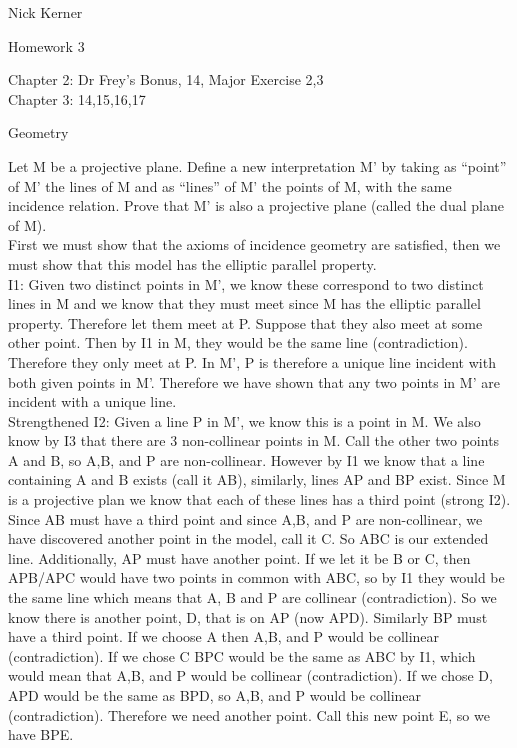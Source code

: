 \documentclass[12pt,letterpaper]{article}
\newcommand{\pro}[1]{\noindent {\bf #1}}
\begin{document}
\begin{flushright}
Nick Kerner

Homework 3

Chapter 2: Dr Frey's Bonus, 14, Major Exercise 2,3\\
Chapter 3: 14,15,16,17
\end{flushright}
\begin{center}
\large{Geometry}\\
\end{center}


\pro{Dr Frey's Bonus but required fun question}

Let M be a projective plane.  Define a new interpretation M' by taking as ``point'' of M' the lines of M and as ``lines'' of M' the points of M, with the same incidence relation.  Prove that M' is also a projective plane (called the dual plane of M).\\

First we must show that the axioms of incidence geometry are satisfied, then we must show that this model has the elliptic parallel property.  \\

I1: Given two distinct points in M', we know these correspond to two distinct lines in M and we know that they must meet since M has the elliptic parallel property.  Therefore let them meet at P. Suppose that they also meet at some other point.  Then by I1 in M, they would be the same line (contradiction).  Therefore they only meet at P.  In M', P is therefore a unique line incident with both given points in M'.  Therefore we have shown that any two points in M' are incident with a unique line.\\

Strengthened I2: Given a line P in M', we know this is a point in M.  We also know by I3 that there are 3 non-collinear points in M.  Call the other two points A and B, so A,B, and P are non-collinear.  However by I1 we know that a line containing A and B exists (call it AB), similarly, lines AP and BP exist.  Since M is a projective plan we know that each of these lines has a third point (strong I2).  Since AB must have a third point and since A,B, and P are non-collinear, we have discovered another point in the model, call it C. So ABC is our extended line.  Additionally, AP must have another point.  If we let it be B or C, then APB/APC would have two points in common with ABC, so by I1 they would be the same line which means that A, B and P are collinear (contradiction).  So we know there is another point, D, that is on AP (now APD).  Similarly BP must have a third point.  If we choose A then A,B, and P would be collinear (contradiction).  If we chose C BPC would be the same as ABC by I1, which would mean that A,B, and P would be collinear (contradiction).  If we chose D, APD would be the same as BPD, so A,B, and P would be collinear (contradiction).  Therefore we need another point.  Call this new point E, so we have BPE.\\
\end{document}
